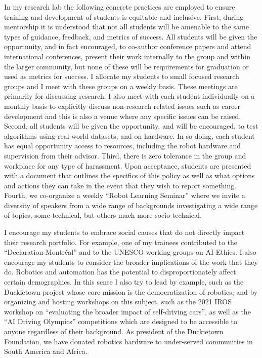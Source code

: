\documentclass[english,
]{nserc-alliance}
\begin{document}
In my research lab  the following concrete practices are employed to ensure training and development of students is equitable and inclusive.
First, during mentorship it is understood that not all students will be amenable to the same types of guidance, feedback, and metrics of success.
All students will be given the opportunity, and in fact encouraged, to co-author conference papers and attend international conferences, present their work internally to the group and within the larger community, but none of these will be requirements for graduation or used as metrics for success.
I allocate my students to small focused research groups and I meet with these groups on a weekly basis.
These meetings are primarily for discussing research.
I also meet with each student individually on a monthly basis to explicitly discuss non-research related issues such as career development and this is also a venue where any specific issues can be raised.
Second, all students will be given the opportunity, and will be encouraged, to test algorithms using real-world datasets, and on hardware.
In so doing, each student has equal opportunity access to resources, including the robot hardware and supervision from their advisor.
Third, there is zero tolerance in the group and workplace for any type of harassment. Upon acceptance, students are presented with a document that outlines the specifics of this policy as well as what options and actions they can take in the event that they wish to report something.
Fourth,  we  co-organize a weekly ``Robot Learning Seminar'' where we invite a diversity of speakers from a wide range of backgrounds investigating a wide range of topics, some technical, but others much more socio-technical.


I encourage my students to embrace social causes that do not directly impact their research portfolio. For example, one of my trainees contributed to the ``Declaration Montréal'' and to the UNESCO working groups on AI Ethics.
I also encourage my students to consider the broader implications of the work that they do. Robotics and automation has the potential to disproportionately affect certain demographics. In this sense I also try to lead by example, such as the Duckietown project whose core mission is the democratization of robotics, and by organizing and hosting workshops on this subject, such as the 2021 IROS workshop on ``evaluating the broader impact of self-driving cars'', as well as the ``AI Driving Olympics'' competitions which are designed to be accessible to anyone regardless of their background. As president of the Duckietown Foundation, we have donated robotics hardware to under-served communities in South America and Africa. 
\end{document}
